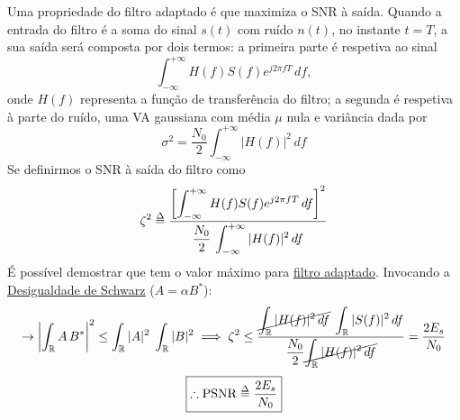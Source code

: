 \noindent Uma propriedade do filtro adaptado é que maximiza o SNR à saída. Quando a entrada do filtro é a soma do sinal $s(t)$ com ruído $n(t)$, no instante $t=T$, a sua saída será composta por dois termos: a primeira parte é respetiva ao sinal
$$
    \int_{-\infty}^{+\infty} H(f) S(f) e^{j2\pi f T} \,df,
$$
onde $H(f)$ representa a função de transferência do filtro; a segunda é respetiva à parte do ruído, uma VA gaussiana com média $\mu$ nula e variância dada por
$$
    \sigma^2 = \frac{N_0}{2}\int_{-\infty}^{+\infty} |H(f)|^2 \,df
$$
Se definirmos o SNR à saída do filtro como
$$
    \zeta^2 \delequal \dfrac{\displaystyle \left[ \int_{-\infty}^{+\infty} H(f) S(f) e^{j2\pi f T} \,df \right]^2}{\displaystyle \frac{N_0}{2}\, \int_{-\infty}^{+\infty} |H(f)|^2 \,df}
$$
É possível demostrar que tem o valor máximo para \underline{filtro adaptado}. Invocando a \hyperref[subsubsec:shwarz]{\underline{Desigualdade de Schwarz}} ($A = \alpha B^*$):
\vspace{-1em}
$$
    \rightarrow \left| \int_{\mathbb{R}} A\, B^* \right|^2 \leq \int_{\mathbb{R}} |A|^2\; \int_{\mathbb{R}} |B|^2
    \implies
    \zeta^2 \leq \frac{\displaystyle \cancel{\int_{\mathbb{R}} |H(f)|^2 \,df}\; \int_{\mathbb{R}} |S(f)|^2 \,df}{\displaystyle \frac{N_0}{2} \cancel{\int_{\mathbb{R}} |H(f)|^2 \,df}}
    = \frac{2 E_s}{N_0}
$$
\vspace{-1em}%
$$
    \boxed{%
        \therefore \text{PSNR} \delequal \frac{2E_s}{N_0}
    }
$$
